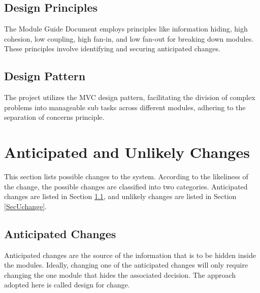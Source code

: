 \documentclass[12pt, titlepage]{article}
\begin{document}
\subsection{Design Principles}
The Module Guide Document employs principles like information hiding, high cohesion, low coupling, high fan-in, and low fan-out for breaking down modules. These principles involve identifying and securing anticipated changes.

\subsection{Design Pattern}
The project utilizes the MVC design pattern, facilitating the division of complex problems into manageable sub tasks across different modules, adhering to the separation of concerns principle.

\section{Anticipated and Unlikely Changes} \label{SecChange}

This section lists possible changes to the system. According to the likeliness
of the change, the possible changes are classified into two
categories. Anticipated changes are listed in Section \ref{SecAchange}, and
unlikely changes are listed in Section \ref{SecUchange}.

\subsection{Anticipated Changes} \label{SecAchange}

Anticipated changes are the source of the information that is to be hidden
inside the modules. Ideally, changing one of the anticipated changes will only
require changing the one module that hides the associated decision. The approach
adopted here is called design for change.
\end{document}

